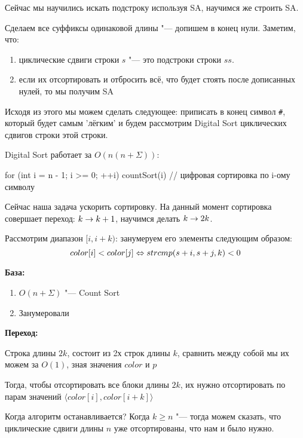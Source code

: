 Сейчас мы научились искать подстроку используя SA, научимся же строить SA.

Сделаем все суффиксы одинаковой длины "--- допишем в конец нули. Заметим, что:
\begin{enumerate}
	\item циклические сдвиги строки $s$ "--- это подстроки строки $ss$.
	\item если их отсортировать и отбросить всё, что будет стоять после дописанных нулей, то мы получим SA
\end{enumerate}

Исходя из этого мы можем сделать следующее: приписать в конец символ \texttt{\#}, который будет самым 'лёгким'  и 
будем рассмотрим Digital Sort циклических сдвигов строки этой строки. 

Digital Sort работает за $O(n(n + \Sigma))$:
\begin{cppcode}
	for (int i = n - 1; i >= 0; ++i)
		countSort(i) // цифровая сортировка по i-ому символу
\end{cppcode}
	
Сейчас наша задача ускорить сортировку. На данный момент сортировка совершает переход: $k \rightarrow k + 1$,  научимся делать $k \rightarrow 2k$.
	
Рассмотрим диапазон $[i, i + k)$: занумеруем его элементы следующим образом:
\[ color[i] < color[j] \Leftrightarrow strcmp(s + i, s + j,  k) < 0 \]
	
\textbf{База:}

\begin{enumerate}
	\item $O(n + \Sigma)$ "--- Count Sort
	\item Занумеровали
\end{enumerate}
	
\textbf{Переход:}

	Строка длины 	$2k$, состоит из 2х строк длины $k$, сравнить между собой мы их можем за $O(1)$, зная значения $color$ и $p$
	
	
	
	Тогда, чтобы отсортировать все блоки длины $2k$, их нужно отсортировать по парам значений $\langle color[i], color[i + k] \rangle$
	
	Когда алгоритм останавливается? Когда $k \geq n$ "--- тогда можем сказать, что циклические сдвиги длины $n$ уже отсортированы, что нам и было нужно.

